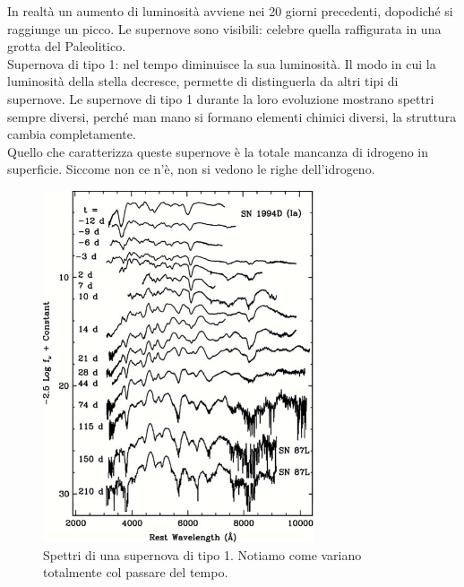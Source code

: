 \documentclass[a4paper,11pt]{article}
\begin{document}
In realtà un aumento di luminosità avviene nei 20 giorni precedenti, dopodiché si raggiunge un picco. Le supernove sono visibili: celebre quella raffigurata in una grotta del Paleolitico. \\ Supernova di tipo 1: nel tempo diminuisce la sua luminosità. Il modo in cui la luminosità della stella decresce, permette di distinguerla da altri tipi di supernove. Le supernove di tipo 1 durante la loro evoluzione mostrano spettri sempre diversi, perché man mano si formano elementi chimici diversi, la struttura cambia completamente.\\
Quello che caratterizza queste supernove è la totale mancanza di idrogeno in superficie. Siccome non ce n'è, non si vedono le righe dell'idrogeno.\\
\begin{figure}[h!!]
        \centering
        \includegraphics[width=8cm]{lezione 28 novembre/spettrisupernova.png}
        \caption{Spettri di una supernova di tipo 1. Notiamo come variano totalmente col passare del tempo.}
        \label{lezione 28 novembre/spettrisupernova.png}
    \end{figure}
\\

\newpage
\end{document}
